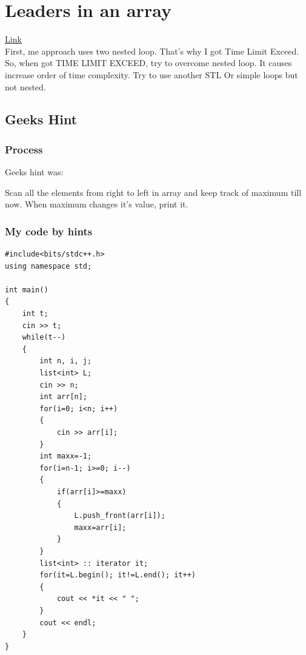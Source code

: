 \documentclass[11 pt]{article}
\begin{document}
\section{Leaders in an array}
\href{https://practice.geeksforgeeks.org/problems/leaders-in-an-array/0/}{Link}\\
First, me approach uses two nested loop. That's why I got Time Limit Exceed. So, when got TIME LIMIT EXCEED, try to overcome nested loop. It causes increase order of time complexity. Try to use another STL Or simple loops but not nested.

\pagebreak
\subsection{Geeks Hint}
\subsubsection{Process}
Geeks hint was:\\
\begin{tcolorbox}[arc = 6 mm, outer arc = 1 mm]
Scan all the elements from right to left in array and keep track of maximum till now. When maximum changes it’s value, print it.
\end{tcolorbox}
\subsubsection{My code by hints}
\begin{lstlisting}[caption=Leaders in an array]
#include<bits/stdc++.h>
using namespace std;

int main()
{
    int t;
    cin >> t;
    while(t--)
    {
        int n, i, j;
        list<int> L;
        cin >> n;
        int arr[n];
        for(i=0; i<n; i++)
        {
            cin >> arr[i];
        }
        int maxx=-1;
        for(i=n-1; i>=0; i--)
        {
            if(arr[i]>=maxx)
            {
                L.push_front(arr[i]);
                maxx=arr[i];
            }
        }
        list<int> :: iterator it;
        for(it=L.begin(); it!=L.end(); it++)
        {
            cout << *it << " ";
        }
        cout << endl;
    }
}
\end{lstlisting}
\end{document}
